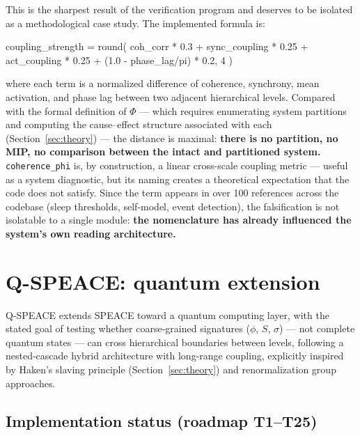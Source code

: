 \documentclass[11pt,a4paper]{article}
\newcommand{\code}[1]{\texttt{#1}}
\newcommand{\coherencephi}{\code{coherence\_phi}}
\begin{document}
This is the sharpest result of the verification program and deserves to be isolated as a methodological case study. The implemented formula is:

\begin{codeblock}
coupling_strength = round(
    coh_corr * 0.3 + sync_coupling * 0.25 +
    act_coupling * 0.25 + (1.0 - phase_lag/pi) * 0.2,
    4
)
\end{codeblock}

where each term is a normalized difference of coherence, synchrony, mean activation, and phase lag between two adjacent hierarchical levels. Compared with the formal definition of $\Phi$ --- which requires enumerating system partitions and computing the cause--effect structure associated with each (Section~\ref{sec:theory}) --- the distance is maximal: \textbf{there is no partition, no MIP, no comparison between the intact and partitioned system.} \coherencephi{} is, by construction, a linear cross-scale coupling metric --- useful as a system diagnostic, but its naming creates a theoretical expectation that the code does not satisfy. Since the term appears in over 100 references across the codebase (sleep thresholds, self-model, event detection), the falsification is not isolatable to a single module: \textbf{the nomenclature has already influenced the system's own reading architecture.}

\section{Q-SPEACE: quantum extension}
\label{sec:qspeace}

Q-SPEACE extends SPEACE toward a quantum computing layer, with the stated goal of testing whether coarse-grained signatures ($\phi$, $S$, $\sigma$) --- not complete quantum states --- can cross hierarchical boundaries between levels, following a nested-cascade hybrid architecture with long-range coupling, explicitly inspired by Haken's slaving principle (Section~\ref{sec:theory}) and renormalization group approaches.

\subsection{Implementation status (roadmap T1--T25)}
\end{document}
